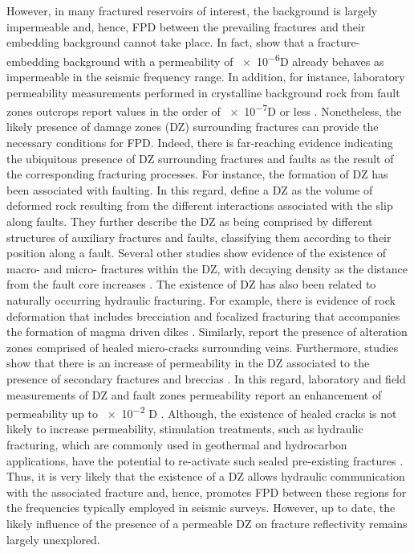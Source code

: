 \documentclass[draft]{agujournal2019}
\begin{document}
However, in many fractured reservoirs of interest, the background is largely impermeable
and, hence, FPD  between the prevailing fractures and their embedding background cannot take place. In fact,  show that a fracture-embedding background with a permeability of  \num{e-6}D already behaves as impermeable in the seismic frequency range. In addition, for instance, laboratory permeability measurements performed in crystalline background rock from fault zones outcrops report values in the order of \num{e-7}D or less \cite{Wibberley2003, Mitchell2012}.
Nonetheless, the likely presence of damage zones (DZ) surrounding fractures can provide the necessary conditions for FPD.
Indeed, there is  far-reaching evidence indicating the ubiquitous presence of DZ surrounding fractures and faults 
as the result of the corresponding fracturing processes. 
For instance, the formation of DZ has been associated with
faulting. In this regard,  define a DZ as the volume of deformed rock resulting from the different interactions associated with the slip along faults. They further describe the DZ as being comprised by  different structures of auxiliary fractures and faults, classifying them according to their position along a fault. Several other studies show evidence of the existence of macro- and micro- fractures within the DZ, with decaying density as the distance from the fault core increases \cite{Mitchell2009,Faulkner2011, Savage2011}.
The existence of  DZ has also been related to naturally occurring hydraulic fracturing. For example, there is evidence of rock deformation that includes brecciation and focalized fracturing that accompanies the formation of magma driven dikes \cite{Delaney1981, Brown2007}. Similarly,  report the presence of alteration zones comprised of healed micro-cracks surrounding veins.
Furthermore, studies show that there is an increase of permeability in the DZ  associated to the presence of secondary fractures  \cite{Mitchell2012} and breccias \cite{Sruoga2004, Sruoga2007}. In this regard, laboratory and field measurements of DZ and fault zones permeability report an enhancement of permeability up to \num{e-2} D \cite{Brace1984,Wibberley2003}.
Although, the existence of healed cracks is not likely to increase permeability, stimulation treatments, such as hydraulic fracturing, which are commonly used in geothermal and hydrocarbon applications, have the potential to re-activate such sealed pre-existing fractures \cite{gale2010natural, dahi2013natural}.
Thus, it is very likely that the existence of a DZ  allows hydraulic communication with the associated fracture and, hence, promotes FPD between these regions for the frequencies typically employed in seismic surveys. However, up to date, the likely influence of the presence of a permeable DZ on fracture reflectivity remains largely unexplored. 
\end{document}
